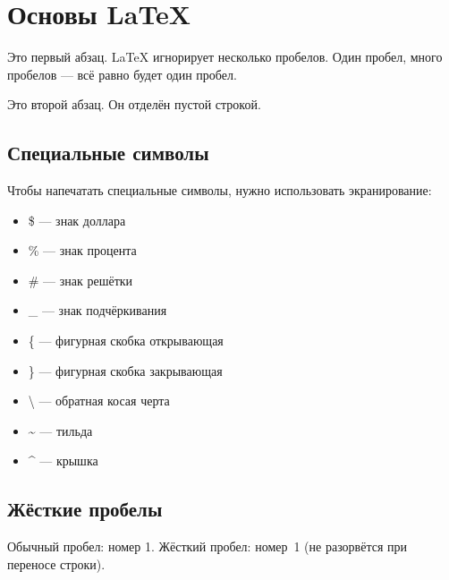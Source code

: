 \documentclass{article}
\begin{document}
\section{Основы LaTeX}

Это первый абзац. LaTeX игнорирует несколько пробелов.
Один пробел,   много пробелов   — всё равно будет один пробел.

Это второй абзац. Он отделён пустой строкой.

\subsection{Специальные символы}

Чтобы напечатать специальные символы, нужно использовать экранирование:

\begin{itemize}
  \item \$ — знак доллара
  \item \% — знак процента
  \item \# — знак решётки
  \item \_ — знак подчёркивания
  \item \{ — фигурная скобка открывающая
  \item \} — фигурная скобка закрывающая
  \item \textbackslash{} — обратная косая черта
  \item \textasciitilde{} — тильда
  \item \textasciicircum{} — крышка
\end{itemize}

\subsection{Жёсткие пробелы}

Обычный пробел: номер 1.
Жёсткий пробел: номер~1 (не разорвётся при переносе строки).
\end{document}
